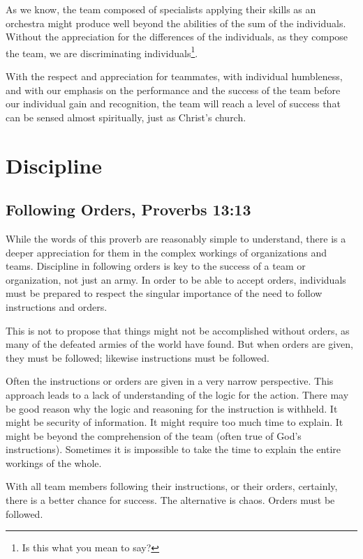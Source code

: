 \documentclass[12pt]{memoir}
\begin{document}
As we know, the team composed of specialists applying their skills
as an orchestra might produce well beyond the abilities of the sum
of the individuals. Without the appreciation for the differences of
the individuals, as they compose the team, we are discriminating individuals\footnote{Is this what you mean to say?}.

With the respect and appreciation for teammates, with individual humbleness,
and with our emphasis on the performance and the success of the team
before our individual gain and recognition, the team will reach a
level of success that can be sensed almost spiritually, just as Christ's
church.

\section{Discipline}
\subsection[Following Orders]{Following Orders, Proverbs 13:13}

While the words of this proverb are reasonably simple to understand,
there is a deeper appreciation for them in the complex workings of
organizations and teams. Discipline in following orders is key to
the success of a team or organization, not just an army. In order
to be able to accept orders, individuals must be prepared to respect
the singular importance of the need to follow instructions and orders.

This is not to propose that things might not be accomplished without
orders, as many of the defeated armies of the world have found. But
when orders are given, they must be followed; likewise instructions
must be followed.

Often the instructions or orders are given in a very narrow perspective.
This approach leads to a lack of understanding of the logic for the
action. There may be good reason why the logic and reasoning for the
instruction is withheld. It might be security of information. It might
require too much time to explain. It might be beyond the comprehension
of the team (often true of God's instructions). Sometimes it is impossible
to take the time to explain the entire workings of the whole.

With all team members following their instructions, or their orders,
certainly, there is a better chance for success. The alternative is
chaos. Orders must be followed.
\end{document}
